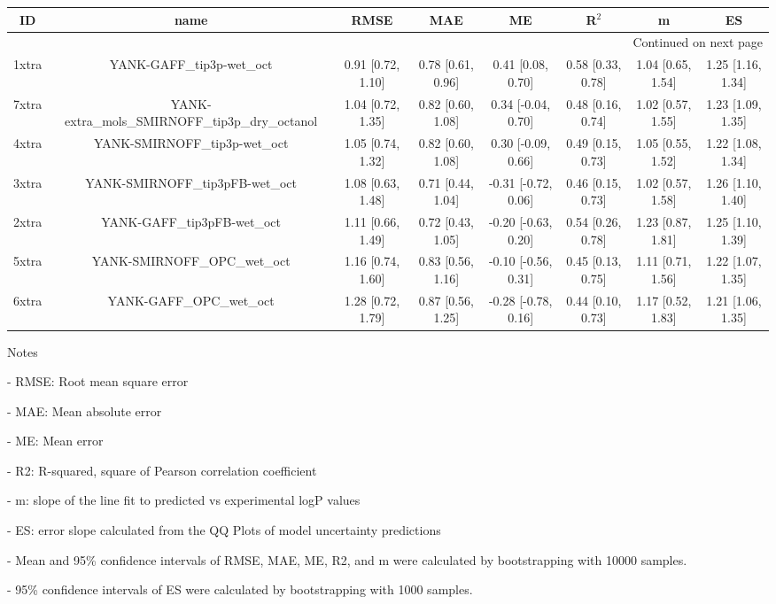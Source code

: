 \documentclass{article}
\begin{document}
\begin{center}
\begin{longtable}{|cccccccc|}
\toprule
    ID &                                             name &               RMSE &                MAE &                   ME &              R$^2$ &                  m &                 ES \\
\midrule
\endhead
\midrule
\multicolumn{8}{r}{{Continued on next page}} \\
\midrule
\endfoot

\bottomrule
\endlastfoot
 1xtra &                        YANK-GAFF\_tip3p-wet\_oct &  0.91 [0.72, 1.10] &  0.78 [0.61, 0.96] &    0.41 [0.08, 0.70] &  0.58 [0.33, 0.78] &  1.04 [0.65, 1.54] &  1.25 [1.16, 1.34] \\
 7xtra &  YANK-extra\_mols\_SMIRNOFF\_tip3p\_dry\_octanol &  1.04 [0.72, 1.35] &  0.82 [0.60, 1.08] &   0.34 [-0.04, 0.70] &  0.48 [0.16, 0.74] &  1.02 [0.57, 1.55] &  1.23 [1.09, 1.35] \\
 4xtra &                    YANK-SMIRNOFF\_tip3p-wet\_oct &  1.05 [0.74, 1.32] &  0.82 [0.60, 1.08] &   0.30 [-0.09, 0.66] &  0.49 [0.15, 0.73] &  1.05 [0.55, 1.52] &  1.22 [1.08, 1.34] \\
 3xtra &                  YANK-SMIRNOFF\_tip3pFB-wet\_oct &  1.08 [0.63, 1.48] &  0.71 [0.44, 1.04] &  -0.31 [-0.72, 0.06] &  0.46 [0.15, 0.73] &  1.02 [0.57, 1.58] &  1.26 [1.10, 1.40] \\
 2xtra &                      YANK-GAFF\_tip3pFB-wet\_oct &  1.11 [0.66, 1.49] &  0.72 [0.43, 1.05] &  -0.20 [-0.63, 0.20] &  0.54 [0.26, 0.78] &  1.23 [0.87, 1.81] &  1.25 [1.10, 1.39] \\
 5xtra &                     YANK-SMIRNOFF\_OPC\_wet\_oct &  1.16 [0.74, 1.60] &  0.83 [0.56, 1.16] &  -0.10 [-0.56, 0.31] &  0.45 [0.13, 0.75] &  1.11 [0.71, 1.56] &  1.22 [1.07, 1.35] \\
 6xtra &                         YANK-GAFF\_OPC\_wet\_oct &  1.28 [0.72, 1.79] &  0.87 [0.56, 1.25] &  -0.28 [-0.78, 0.16] &  0.44 [0.10, 0.73] &  1.17 [0.52, 1.83] &  1.21 [1.06, 1.35] \\
\end{longtable}
\end{center}

Notes

- RMSE: Root mean square error

- MAE: Mean absolute error

- ME: Mean error

- R2: R-squared, square of Pearson correlation coefficient

- m: slope of the line fit to predicted vs experimental logP values

- ES: error slope calculated from the QQ Plots of model uncertainty predictions

- Mean and 95\% confidence intervals of RMSE, MAE, ME, R2, and m were calculated by bootstrapping with 10000 samples.

- 95\% confidence intervals of ES were calculated by bootstrapping with 1000 samples.\end{document}
\end{document}
